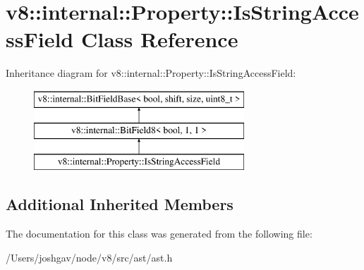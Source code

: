 \hypertarget{classv8_1_1internal_1_1_property_1_1_is_string_access_field}{}\section{v8\+:\+:internal\+:\+:Property\+:\+:Is\+String\+Access\+Field Class Reference}
\label{classv8_1_1internal_1_1_property_1_1_is_string_access_field}
Inheritance diagram for v8\+:\+:internal\+:\+:Property\+:\+:Is\+String\+Access\+Field\+:\begin{figure}[H]
\begin{center}
\leavevmode
\includegraphics[height=3.000000cm]{classv8_1_1internal_1_1_property_1_1_is_string_access_field}
\end{center}
\end{figure}
\subsection*{Additional Inherited Members}


The documentation for this class was generated from the following file\+:\begin{DoxyCompactItemize}
\item 
/\+Users/joshgav/node/v8/src/ast/ast.\+h\end{DoxyCompactItemize}
